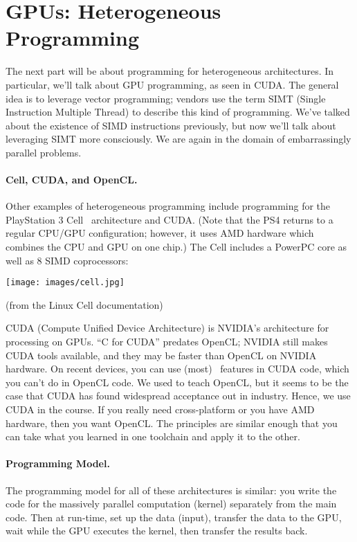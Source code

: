 




\section*{GPUs: Heterogeneous Programming}

The next part will be about programming for heterogeneous
architectures. In particular, we'll talk about GPU programming, as
seen in CUDA. The general idea is to
leverage vector programming; vendors use the term SIMT (Single
Instruction Multiple Thread) to describe this kind of
programming. We've talked about the existence of SIMD instructions
previously, but now we'll talk about leveraging SIMT more
consciously. We are again in the domain of embarrassingly parallel
problems.

\paragraph{Cell, CUDA, and OpenCL.} 
Other examples of heterogeneous programming include
programming for the PlayStation 3 Cell~\cite{cellprimer} architecture and CUDA. (Note that the PS4 returns to a regular CPU/GPU configuration; however, it uses AMD hardware which combines the CPU and GPU on one chip.) The Cell includes a PowerPC core as well as
8 SIMD coprocessors:

\begin{center}
\texttt{[image: images/cell.jpg]}
\end{center}
\hfill (from the Linux Cell documentation)

CUDA (Compute Unified Device Architecture) is NVIDIA's architecture
for processing on GPUs. ``C for CUDA'' predates OpenCL; NVIDIA still
makes CUDA tools available, and they may be faster than OpenCL on NVIDIA
hardware. On recent devices, you can use (most) \CPP~features in CUDA code,
which you can't do in OpenCL code. We used to teach OpenCL, but it seems
to be the case that CUDA has found widespread acceptance out in industry.
Hence, we use CUDA in the course. If you really need cross-platform or 
you have AMD hardware, then you want OpenCL. The principles are similar 
enough that you can take what you learned in one toolchain and apply it 
to the other.

\paragraph{Programming Model.} The programming
model for all of these architectures is similar: you write the code for
the massively parallel computation (kernel) separately from the main
code. Then at run-time, set up the data (input), transfer the data to the GPU, wait while the GPU executes the kernel, then transfer the results back. 

